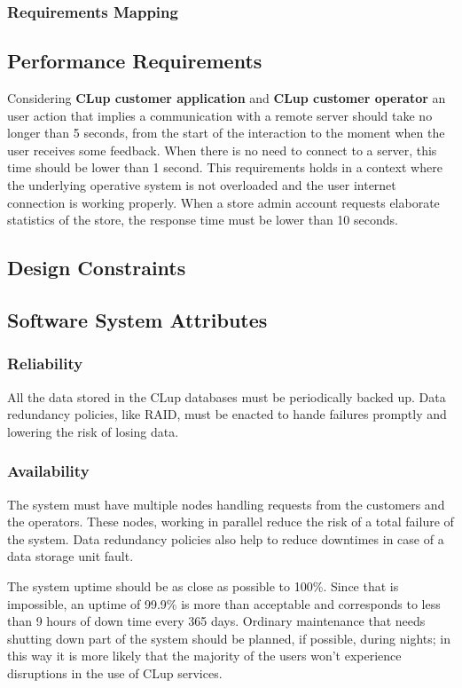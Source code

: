 \subsubsection{Requirements Mapping}
\subsection{Performance Requirements}
Considering \textbf{CLup customer application} and \textbf{CLup customer operator} an user action that implies a communication with a remote server should take no longer than 5 seconds, from the start of the interaction to the moment when the user receives some feedback. When there is no need to connect to a server, this time should be lower than 1 second. This requirements holds in a context where the underlying operative system is not overloaded and the user internet connection is working properly.
\smallskip
When a store admin account requests elaborate statistics of the store, the response time must be lower than 10 seconds.
\subsection{Design Constraints}
\subsection{Software System Attributes}
\subsubsection{Reliability}
All the data stored in the CLup databases must be periodically backed up. Data redundancy policies, like RAID, must be enacted to hande failures promptly and lowering the risk of losing data.

\subsubsection{Availability}
The system must have multiple nodes handling requests from the customers and the operators. These nodes, working in parallel reduce the risk of a total failure of the system. Data redundancy policies also help to reduce downtimes in case of a data storage unit fault.

\smallskip

The system uptime should be as close as possible to 100\%. Since that is impossible, an uptime of 99.9\% is more than acceptable and corresponds to less than 9 hours of down time every 365 days.
Ordinary maintenance that needs shutting down part of the system should be planned, if possible, during nights; in this way it is more likely that the majority of the users won't experience disruptions in the use of CLup services.

